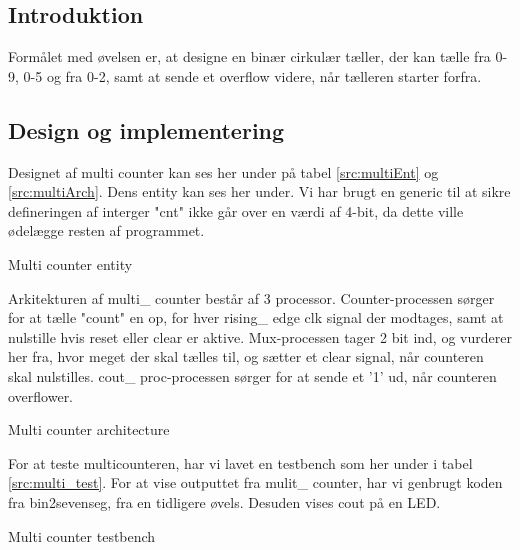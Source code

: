 \documentclass[../journal.tex]{subfiles}
\begin{document}
\subsection{Introduktion}
Formålet med øvelsen er, at designe en binær cirkulær tæller, der kan tælle fra 0-9, 0-5 og fra 0-2, samt at sende et overflow videre, når tælleren starter forfra. 

\subsection{Design og implementering}
Designet af multi counter kan ses her under på tabel \ref{src:multiEnt} og \ref{src:multiArch}. Dens entity kan ses her under. Vi har brugt en generic til at sikre defineringen af interger "cnt" ikke går over en værdi af 4-bit, da dette ville ødelægge resten af programmet.

\begin{table}[H]
    \centering
      \framebox{
        \rule{8pt}{0pt}
          
  }
  \caption{Multi counter entity}	
  \label{src:multiEnt}
\end{table}

Arkitekturen af multi\_ counter består af 3 processor. Counter-processen sørger for at tælle "count" en op, for hver rising\_ edge clk signal der modtages, samt at nulstille hvis reset eller clear er aktive. Mux-processen tager 2 bit ind, og vurderer her fra, hvor meget der skal tælles til, og sætter et clear signal, når counteren skal nulstilles. cout\_ proc-processen sørger for at sende et '1' ud, når counteren overflower.

\begin{table}[H]
    \centering
      \framebox{
        \rule{8pt}{0pt}
          
  }
  \caption{Multi counter architecture}	
  \label{src:multiArch}
\end{table}

For at teste multicounteren, har vi lavet en testbench som her under i tabel \ref{src:multi_test}. For at vise outputtet fra mulit\_ counter, har vi genbrugt koden fra bin2sevenseg, fra en tidligere øvels. Desuden vises cout på en LED.

\begin{table}[H]
  \centering
    \framebox{
      \rule{8pt}{0pt}
        
}
\caption{Multi counter testbench}	
\label{src:multi_test}
\end{table}
\end{document}
